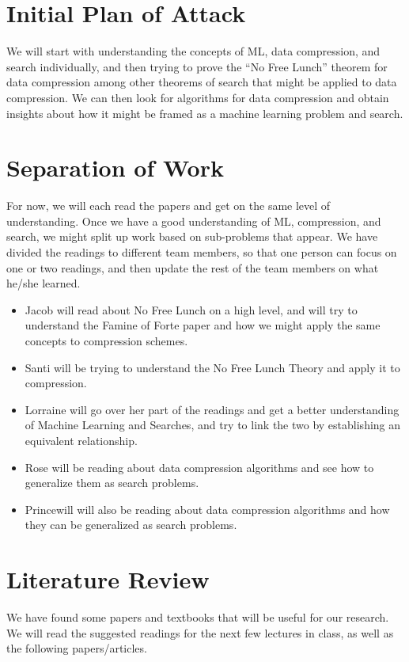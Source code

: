 \documentclass[12pt]{article}
\begin{document}
\section{Initial Plan of Attack}

We will start with understanding the concepts of ML, data compression, and search individually, and then trying to prove the “No Free Lunch” theorem for data compression among other theorems of search that might be applied to data compression. We can then look for algorithms for data compression and obtain insights about how it might be framed as a machine learning problem and search.

\section{Separation of Work}

For now, we will each read the papers and get on the same level of understanding. Once we have a good understanding of ML, compression, and search, we might split up work based on sub-problems that appear. We have divided the readings to different team members, so that one person can focus on one or two readings, and then update the rest of the team members on what he/she learned.

\begin{itemize}
\item
Jacob will read about No Free Lunch on a high level, and will try to understand the Famine of Forte paper and how we might apply the same concepts to compression schemes.
\item
Santi will be trying to understand the No Free Lunch Theory and apply it to compression.
\item
Lorraine will go over her part of the readings and get a better understanding of Machine Learning and Searches, and try to link the two by establishing an equivalent relationship.
\item
Rose will be reading about data compression algorithms and see how to generalize them as search problems. 
\item
Princewill will also be reading about data compression algorithms and how they can be generalized as search problems. 
\end{itemize}

\section{Literature Review}

We have found some papers and textbooks that will be useful for our research.
We will read the suggested readings for the next few lectures in class, as well as the following papers/articles.
\end{document}
